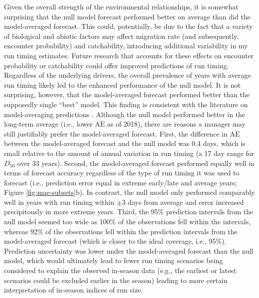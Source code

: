 \documentclass[12pt,]{book}
\theoremstyle{definition}
\theoremstyle{definition}
\theoremstyle{definition}
\theoremstyle{remark}
\begin{document}
Given the overall strength of the environmental relationships, it is
somewhat surprising that the null model forecast performed better on
average than did the model-averaged forecast. This could, potentially,
be due to the fact that a variety of biological \citetext{\citealp[size;
e.g.,][ and morphology]{bromaghin-2005}; \citealp{hamon-etal-2000}} and
abiotic factors \citetext{\citealp[temperature; e.g.,][river
discharge]{salinger-anderson-2006}; \citealp[e.g.,][and migration
distance]{keefer-etal-2004}; \citealp[e.g.,][]{eiler-etal-2015}} may
affect migration rate (and subsequently, encounter probability) and
catchability, introducing additional variability in my run timing
estimates. Future research that accounts for these effects on encounter
probability or catchability could offer improved predictions of run
timing. Regardless of the underlying drivers, the overall prevalence of
years with average run timing likely led to the enhanced performance of
the null model. It is not surprising, however, that the model-averaged
forecast performed better than the supposedly single ``best'' model.
This finding is consistent with the literature on model-averaging
predictions \citep{burnham-anderson-2002}. Although the null model
performed better in the long-term average (i.e., lower
\(\overline{\text{AE}}\) as of 2018), there are reasons a manager may
still justifiably prefer the model-averaged forecast. First, the
difference in \(\overline{\text{AE}}\) between the model-averaged
forecast and the null model was 0.4 days, which is small relative to the
amount of annual variation in run timing (a 17 day range for \(D_{50}\)
over 33 years). Second, the model-averaged forecast performed equally
well in terms of forecast accuracy regardless of the type of run timing
it was used to forecast (i.e., prediction error equal in extreme
early/late and average years; Figure \ref{fig:mae-subsets}b). In
contrast, the null model only performed comparably well in years with
run timing within \(\pm 3\) days from average and error increased
precipitously in more extreme years. Third, the 95\% prediction
intervals from the null model seemed too wide as 100\% of the
observations fell within the intervals, whereas 92\% of the observations
fell within the prediction intervals from the model-averaged forecast
(which is closer to the ideal coverage, i.e., 95\%). Prediction
uncertainty was lower under the model-averaged forecast than the null
model, which would ultimately lead to fewer run timing scenarios being
considered to explain the observed in-season data (e.g., the earliest or
latest scenarios could be excluded earlier in the season) leading to
more certain interpretation of in-season indices of run size.
\end{document}

